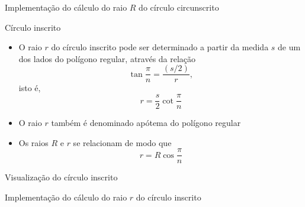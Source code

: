 \begin{frame}[fragile]{Implementação do cálculo do raio $R$ do círculo circunscrito}
\end{frame}

\begin{frame}[fragile]{Círculo inscrito}

    \begin{itemize}
        \item O raio $r$ do círculo inscrito pode ser determinado a partir da medida 
            $s$ de um dos lados do polígono regular, através da relação
        \[
            \tan \frac{\pi}{n} = \frac{(s/2)}{r},
        \]
        isto é,
        \[
            r = \frac{s}{2}\cot\frac{\pi}{n}
        \]
        \pause

        \item O raio $r$ também é denominado apótema do polígono regular
        \pause

        \item Os raios $R$ e $r$ se relacionam de modo que
        \[
            r = R\cos \frac{\pi}{n}
        \]
    \end{itemize}

\end{frame}

\begin{frame}[fragile]{Visualização do círculo inscrito}

    \def\R{3}

    \begin{figure}
    \end{figure}

\end{frame}

\begin{frame}[fragile]{Implementação do cálculo do raio $r$ do círculo inscrito}
\end{frame}


